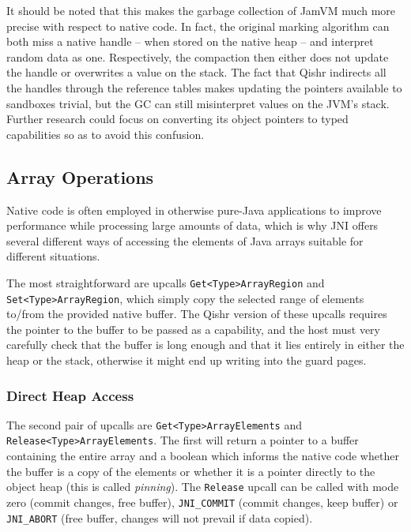 \documentclass[a4paper,12pt,twoside,openright]{report}
\begin{document}
It should be noted that this makes the garbage collection of JamVM much more precise with respect to native code. In fact, the original marking algorithm can both miss a native handle -- when stored on the native heap -- and interpret random data as one. Respectively, the compaction then either does not update the handle or overwrites a value on the stack. The fact that Qishr indirects all the handles through the reference tables makes updating the pointers available to sandboxes trivial, but the GC can still misinterpret values on the JVM's stack. Further research could focus on converting its object pointers to typed capabilities so as to avoid this confusion.

\subsection{Array Operations}

Native code is often employed in otherwise pure-Java applications to improve performance while processing large amounts of data, which is why JNI offers several different ways of accessing the elements of Java arrays suitable for different situations.

The most straightforward are upcalls \texttt{Get\-<Type>\-Array\-Region} and \texttt{Set\-<Type>\-Array\-Region}, which simply copy the selected range of elements to/from the provided native buffer. The Qishr version of these upcalls requires the pointer to the buffer to be passed as a capability, and the host must very carefully check that the buffer is long enough and that it lies entirely in either the heap or the stack, otherwise it might end up writing into the guard pages. 

\subsubsection{Direct Heap Access}
\label{sec:DirectHeapAccess}

The second pair of upcalls are \texttt{Get\-<Type>\-Array\-Elements} and \texttt{Release\-<Type>\-Array\-Elements}. The first will return a pointer to a buffer containing the entire array and a boolean which informs the native code whether the buffer is a copy of the elements or whether it is a pointer directly to the object heap (this is called \emph{pinning}). The \texttt{Release} upcall can be called with mode zero (commit changes, free buffer), \texttt{JNI\_COMMIT} (commit changes, keep buffer) or \texttt{JNI\_ABORT} (free buffer, changes will not prevail if data copied). 
\end{document}
